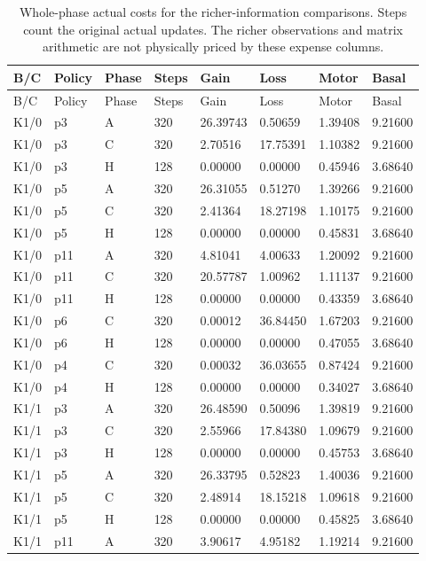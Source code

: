 \begin{longtable}{llllllll}
\caption{Whole-phase actual costs for the richer-information comparisons. Steps count the original actual updates. The richer observations and matrix arithmetic are not physically priced by these expense columns.}\label{tab:rich-action-costs}\\
\toprule
B/C & Policy & Phase & Steps & Gain & Loss & Motor & Basal \\
\midrule
\endfirsthead
\toprule
B/C & Policy & Phase & Steps & Gain & Loss & Motor & Basal \\
\midrule
\endhead
K1/0 & p3 & A & 320 & 26.39743 & 0.50659 & 1.39408 & 9.21600 \\
K1/0 & p3 & C & 320 & 2.70516 & 17.75391 & 1.10382 & 9.21600 \\
K1/0 & p3 & H & 128 & 0.00000 & 0.00000 & 0.45946 & 3.68640 \\
K1/0 & p5 & A & 320 & 26.31055 & 0.51270 & 1.39266 & 9.21600 \\
K1/0 & p5 & C & 320 & 2.41364 & 18.27198 & 1.10175 & 9.21600 \\
K1/0 & p5 & H & 128 & 0.00000 & 0.00000 & 0.45831 & 3.68640 \\
K1/0 & p11 & A & 320 & 4.81041 & 4.00633 & 1.20092 & 9.21600 \\
K1/0 & p11 & C & 320 & 20.57787 & 1.00962 & 1.11137 & 9.21600 \\
K1/0 & p11 & H & 128 & 0.00000 & 0.00000 & 0.43359 & 3.68640 \\
K1/0 & p6 & C & 320 & 0.00012 & 36.84450 & 1.67203 & 9.21600 \\
K1/0 & p6 & H & 128 & 0.00000 & 0.00000 & 0.47055 & 3.68640 \\
K1/0 & p4 & C & 320 & 0.00032 & 36.03655 & 0.87424 & 9.21600 \\
K1/0 & p4 & H & 128 & 0.00000 & 0.00000 & 0.34027 & 3.68640 \\
K1/1 & p3 & A & 320 & 26.48590 & 0.50096 & 1.39819 & 9.21600 \\
K1/1 & p3 & C & 320 & 2.55966 & 17.84380 & 1.09679 & 9.21600 \\
K1/1 & p3 & H & 128 & 0.00000 & 0.00000 & 0.45753 & 3.68640 \\
K1/1 & p5 & A & 320 & 26.33795 & 0.52823 & 1.40036 & 9.21600 \\
K1/1 & p5 & C & 320 & 2.48914 & 18.15218 & 1.09618 & 9.21600 \\
K1/1 & p5 & H & 128 & 0.00000 & 0.00000 & 0.45825 & 3.68640 \\
K1/1 & p11 & A & 320 & 3.90617 & 4.95182 & 1.19214 & 9.21600 \\

\end{longtable}

